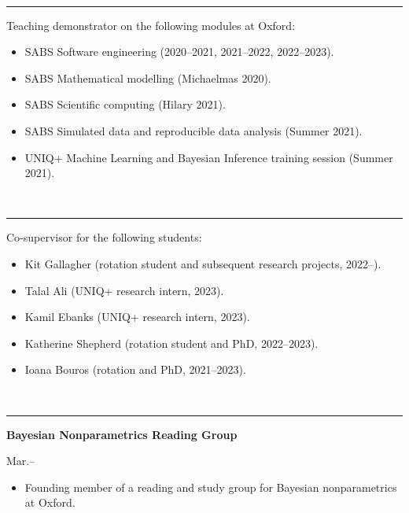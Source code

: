 \documentclass[11pt]{article}
\begin{document}
\vspace{0.6cm}


\vspace{-2.75mm} \\
\rule{\textwidth}{0.4pt}
\vspace{0.1mm}
Teaching demonstrator on the following modules at Oxford:
\begin{itemize}
\setlength{\itemsep}{0pt}
\item SABS Software engineering (2020--2021, 2021--2022, 2022--2023).
\item SABS Mathematical modelling (Michaelmas 2020).
\item SABS Scientific computing (Hilary 2021).
\item SABS Simulated data and reproducible data analysis (Summer 2021).
\item UNIQ+ Machine Learning and Bayesian Inference training session (Summer 2021).
\end{itemize}




\vspace{0.6cm}


\vspace{-2.75mm} \\
\rule{\textwidth}{0.4pt}
\vspace{0.1mm}
Co-supervisor for the following students:
\begin{itemize}
\setlength{\itemsep}{0pt}
\item Kit Gallagher (rotation student and subsequent research projects, 2022--).
\item Talal Ali (UNIQ+ research intern, 2023).
\item Kamil Ebanks (UNIQ+ research intern, 2023).
\item Katherine Shepherd (rotation student and PhD, 2022--2023).
\item Ioana Bouros (rotation and PhD, 2021--2023).
\end{itemize}


\vspace{0.5cm}

\vspace{-2.75mm} \\
\rule{\textwidth}{0.4pt}
\vspace{0.1mm}
\noindent\parbox{.75\textwidth}{\raggedright \textbf{Bayesian Nonparametrics Reading Group}}
\parbox{.25\textwidth}{ Mar.--}
\vspace{-.65cm}
\begin{itemize}
\setlength{\itemsep}{4pt}
\setlength{\parskip}{0pt}
\setlength{\parsep}{0pt}
\item Founding member of a reading and study group for Bayesian nonparametrics at Oxford.
\end{itemize}
\end{document}
